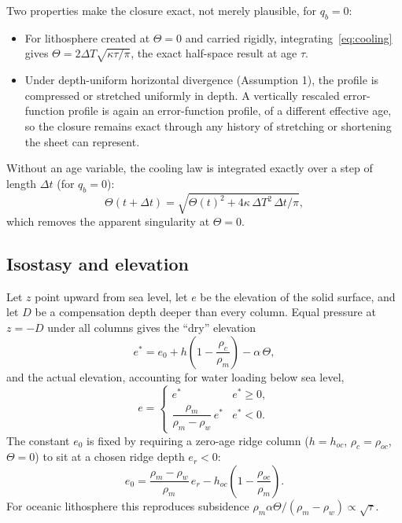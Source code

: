 \documentclass[11pt]{article}
\begin{document}
Two properties make the closure exact, not merely plausible, for $q_b=0$:
\begin{itemize}
\item For lithosphere created at $\Theta=0$ and carried rigidly, integrating~\eqref{eq:cooling} gives $\Theta=2\Delta T\sqrt{\kappa\tau/\pi}$, the exact half-space result at age $\tau$.
\item Under depth-uniform horizontal divergence (Assumption 1), the profile is compressed or stretched uniformly in depth. A vertically rescaled error-function profile is again an error-function profile, of a different effective age, so the closure remains exact through any history of stretching or shortening the sheet can represent.
\end{itemize}
Without an age variable, the cooling law is integrated exactly over a step of length $\Delta t$ (for $q_b=0$):
\begin{equation}
  \Theta(t+\Delta t) = \sqrt{\Theta(t)^2 + 4\kappa\,\Delta T^2\,\Delta t/\pi},
  \label{eq:coolexact}
\end{equation}
which removes the apparent singularity at $\Theta=0$.

\subsection{Isostasy and elevation}
Let $z$ point upward from sea level, let $e$ be the elevation of the solid surface, and let $D$ be a compensation depth deeper than every column. Equal pressure at $z=-D$ under all columns gives the ``dry'' elevation
\begin{equation}
  e^\ast = e_0 + h\left(1-\frac{\rho_c}{\rho_m}\right) - \alpha\,\Theta,
\end{equation}
and the actual elevation, accounting for water loading below sea level,
\begin{equation}
  e = \begin{cases} e^\ast & e^\ast\ge0,\\[2pt] \dfrac{\rho_m}{\rho_m-\rho_w}\,e^\ast & e^\ast<0.\end{cases}
  \label{eq:elev}
\end{equation}
The constant $e_0$ is fixed by requiring a zero-age ridge column ($h=h_{oc}$, $\rho_c=\rho_{oc}$, $\Theta=0$) to sit at a chosen ridge depth $e_r<0$:
\begin{equation}
  e_0 = \frac{\rho_m-\rho_w}{\rho_m}\,e_r - h_{oc}\left(1-\frac{\rho_{oc}}{\rho_m}\right).
\end{equation}
For oceanic lithosphere this reproduces subsidence $\rho_m\alpha\Theta/(\rho_m-\rho_w)\propto\sqrt{\tau}$.
\end{document}
